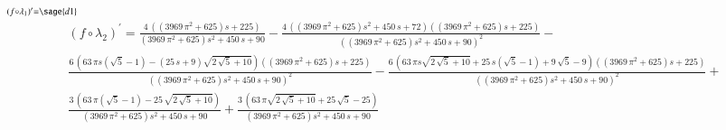 \documentclass[11pt]{article}
\begin{document}
$\scriptstyle (f \circ \lambda_1)^\prime = \sage{d1}$
\begin{multline*}
    \scriptstyle
    (f \circ \lambda_2)^\prime = 
    \frac{4 \, {({(3969 \, \pi^{2} + 625)} s + 225)}}{{(3969 \, \pi^{2} + 625)} s^{2} + 450 \, s + 90} - 
    \frac{4 \, {({(3969 \, \pi^{2} + 625)} s^{2} + 450 \, s + 72)} {({(3969 \, \pi^{2} + 625)} s + 225)}}{{({(3969 \, \pi^{2} + 625)} s^{2} + 450 \, s + 90)}^{2}} -\\
    \scriptstyle
    \frac{6 \, {(63 \, \pi s {(\sqrt{5} - 1)} - {(25 \, s + 9)} \sqrt{2 \, \sqrt{5} + 10})} {({(3969 \, \pi^{2} + 625)} s + 225)}}{{({(3969 \, \pi^{2} + 625)} s^{2} + 450 \, s + 90)}^{2}} - 
    \frac{6 \, {(63 \, \pi s \sqrt{2 \, \sqrt{5} + 10} + 25 \, s {(\sqrt{5} - 1)} + 9 \, \sqrt{5} - 9)} {({(3969 \, \pi^{2} + 625)} s + 225)}}{{({(3969 \, \pi^{2} + 625)} s^{2} + 450 \, s + 90)}^{2}} +\\ 
    \scriptstyle
    \frac{3 \, {(63 \, \pi {(\sqrt{5} - 1)} - 25 \, \sqrt{2 \, \sqrt{5} + 10})}}{{(3969 \, \pi^{2} + 625)} s^{2} + 450 \, s + 90} +
    \frac{3 \, {(63 \, \pi \sqrt{2 \, \sqrt{5} + 10} + 25 \, \sqrt{5} - 25)}}{{(3969 \, \pi^{2} + 625)} s^{2} + 450 \, s + 90}
\end{multline*}
    
\end{document}
